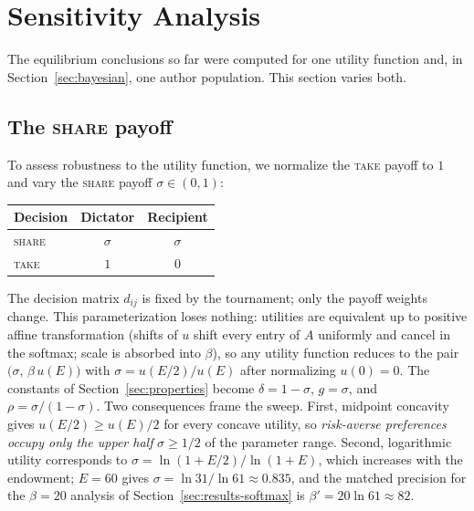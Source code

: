 \section{Sensitivity Analysis}
\label{sec:sensitivity}

The equilibrium conclusions so far were computed for one utility
function and, in Section~\ref{sec:bayesian}, one author population.
This section varies both.

\subsection{The \texorpdfstring{\textup{\textsc{share}}}{SHARE} payoff}
\label{sec:sensitivity-share}

To assess robustness to the utility function, we normalize the
\textup{\textsc{take}} payoff to $1$ and vary the
\textup{\textsc{share}} payoff $\sigma \in (0, 1)$:
\begin{center}
\begin{tabular}{lcc}
  \toprule
  Decision & Dictator & Recipient \\
  \midrule
  \textup{\textsc{share}} & $\sigma$ & $\sigma$ \\
  \textup{\textsc{take}}  & $1$      & $0$ \\
  \bottomrule
\end{tabular}
\end{center}
The decision matrix $d_{ij}$ is fixed by the tournament; only the
payoff weights change.
This parameterization loses nothing: utilities are equivalent up to
positive affine transformation (shifts of $u$ shift every entry of
$A$ uniformly and cancel in the softmax; scale is absorbed into
$\beta$), so any utility function reduces to the pair
$\bigl(\sigma,\, \beta\, u(E)\bigr)$ with
$\sigma = u(E/2)/u(E)$ after normalizing $u(0) = 0$.
The constants of Section~\ref{sec:properties} become
$\delta = 1 - \sigma$, $g = \sigma$, and
$\rho = \sigma / (1 - \sigma)$.
Two consequences frame the sweep.
First, midpoint concavity gives $u(E/2) \ge u(E)/2$ for every concave
utility, so \emph{risk-averse preferences occupy only the upper half}
$\sigma \ge 1/2$ of the parameter range.
Second, logarithmic utility corresponds to
$\sigma = \ln(1 + E/2)/\ln(1 + E)$, which increases with the
endowment; $E = 60$ gives $\sigma = \ln 31 / \ln 61 \approx 0.835$,
and the matched precision for the $\beta = 20$ analysis of
Section~\ref{sec:results-softmax} is
$\beta' = 20 \ln 61 \approx 82$.

